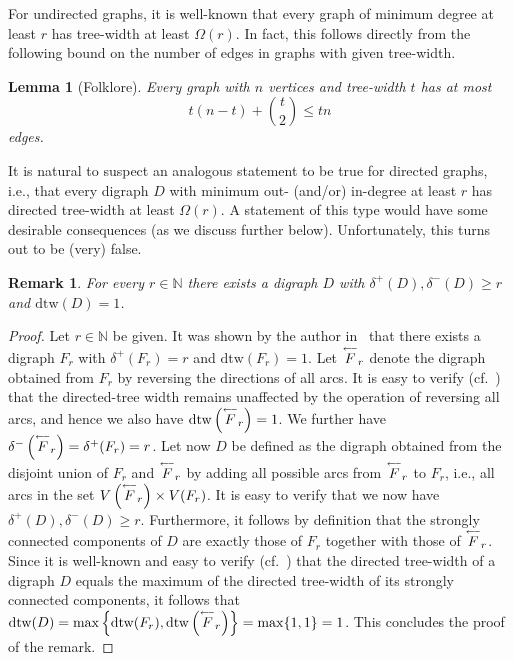 \documentclass[a4paper,10pt]{article}
\newtheorem{lemma}[theorem]{Lemma}
\newtheorem{remark}{Remark}
\newcommand{\revvec}[1]{\overset{\text{\tiny$\longleftarrow$}}{#1}}
\begin{document}
For undirected graphs, it is well-known that every graph of minimum degree at least $r$ has tree-width at least $\Omega(r)$. In fact, this follows directly from the following bound on the number of edges in graphs with given tree-width.
\begin{lemma}[Folklore]\label{lem:twedgebound}
Every graph with $n$ vertices and tree-width $t$ has at most $$t(n-t)+\binom{t}{2}\le tn$$ edges.
\end{lemma}

It is natural to suspect an analogous statement to be true for directed graphs, i.e., that every digraph $D$ with minimum out- (and/or) in-degree at least $r$ has directed tree-width at least $\Omega(r)$. A statement of this type would have some desirable consequences (as we discuss further below). Unfortunately, this turns out to be (very) false.

\begin{remark}\label{rem:outindtw}
For every $r\in \mathbb{N}$ there exists a digraph $D$ with $\delta^+(D), \delta^-(D)\ge r$ and $\mathrm{dtw}(D)=1$. 
\end{remark}
\begin{proof}
Let $r\in \mathbb{N}$ be given. It was shown by the author in~\cite[Remark~2.1]{MR4434351} that there exists a digraph $F_r$ with $\delta^+(F_r)=r$ and $\mathrm{dtw}(F_r)=1$. 
Let $\revvec{F}_r$ denote the digraph obtained from $F_r$ by reversing the directions of all arcs. It is easy to verify (cf.~\cite{MR1828440}) that the directed-tree width remains unaffected by the operation of reversing all arcs, and hence we also have $\mathrm{dtw}\left(\revvec{F}_r\right)=1$. We further have $\delta^-\left(\revvec{F}_r\right)=\delta^+(F_r)=r$. Let now $D$ be defined as the digraph obtained from the disjoint union of $F_r$ and $\revvec{F}_r$ by adding all possible arcs from $\revvec{F}_r$ to $F_r$, i.e., all arcs in the set $V\left(\revvec{F}_r\right)\times V(F_r)$. It is easy to verify that we now have $\delta^+(D),\delta^-(D)\ge r$. Furthermore, it follows by definition that the strongly connected components of $D$ are exactly those of $F_r$ together with those of $\revvec{F}_r$. Since it is well-known and easy to verify (cf.~\cite{MR1828440}) that the directed tree-width of a digraph $D$ equals the maximum of the directed tree-width of its strongly connected components, it follows that $\mathrm{dtw}(D)=\max\left\{\mathrm{dtw}(F_r),\mathrm{dtw}\left(\revvec{F}_r\right)\right\}=\max\{1,1\}=1$. This concludes the proof of the remark.
\end{proof}
\end{document}
